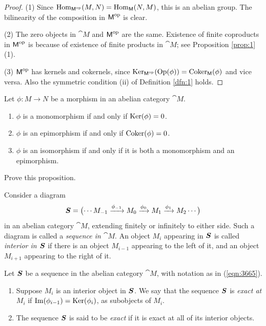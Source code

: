 \begin{proof}
(1) Since
$\operatorname{Hom}_{\operatorname{\mathsf{M}}^{\mathrm{op}}}(M, N) = \operatorname{Hom}_{\operatorname{\mathsf{M}}}(N, M)$,
this is an abelian group. The bilinearity of the composition in 
$\operatorname{\mathsf{M}}^{\mathrm{op}}$ is clear.

\medskip \noindent 
(2) The zero objects in $\cat{M}$ and $\operatorname{\mathsf{M}}^{\mathrm{op}}$ 
are the same. Existence of finite coproducts in 
$\operatorname{\mathsf{M}}^{\mathrm{op}}$ is because of existence of finite products in $\cat{M}$;
see Proposition \ref{prop:1}(1). 

\medskip \noindent 
(3) $\operatorname{\mathsf{M}}^{\mathrm{op}}$ has kernels and cokernels, since 
$\operatorname{Ker}_{\operatorname{\mathsf{M}}^{\mathrm{op}}}(\operatorname{Op}(\phi)) = \operatorname{Coker}_{\operatorname{\mathsf{M}}}(\phi)$ 
and vice versa. Also the symmetric condition (ii) of Definition \ref{dfn:1} 
holds. 
\end{proof}

\begin{prop}
Let $\phi : M \to N$ be a morphism in an abelian category $\cat{M}$. 
\begin{enumerate}
\item $\phi$ is a monomorphism if and only if $\operatorname{Ker}(\phi) = 0$. 
\item $\phi$ is an epimorphism  if and only if $\operatorname{Coker}(\phi) = 0$. 
\item $\phi$ is an isomorphism  if and only if it is both a monomorphism and an 
epimorphism.
\end{enumerate}
\end{prop}

\begin{exer}
Prove this proposition.
\end{exer}

Consider a diagram 
\begin{equation} \label{eqn:3665}
\boldsymbol{S} = \bigl( \cdots  M_{-1} \xrightarrow{\phi_{-1}}
M_{0} \xrightarrow{\phi_0} M_{1} \xrightarrow{\phi_{1}} M_{2} \cdots \bigr)
\end{equation}
in an abelian category $\cat{M}$, extending finitely or infinitely to either 
side. Such a diagram is called a {\em sequence in $\cat{M}$}. 
An object $M_i$ appearing in $\boldsymbol{S}$ is called {\em interior in $\boldsymbol{S}$} 
if there is an object $M_{i - 1}$ appearing to the left of it, and an object 
$M_{i + 1}$ appearing to the right of it. 

\begin{dfn} \label{dfn:3635}
Let $\boldsymbol{S}$ be a sequence in the abelian category $\cat{M}$, with notation 
as in (\ref{eqn:3665}). 
\begin{enumerate}
\item Suppose $M_i$ is an interior object in $\boldsymbol{S}$.
We say that the sequence $\boldsymbol{S}$ is {\em exact at $M_i$} if 
$\operatorname{Im}(\phi_{i - 1}) =  \operatorname{Ker}(\phi_{i})$,
as subobjects of $M_i$. 

\item The sequence $\boldsymbol{S}$ is said to be {\em exact} if it is exact at all 
of its interior objects.
\end{enumerate}
\end{dfn}

